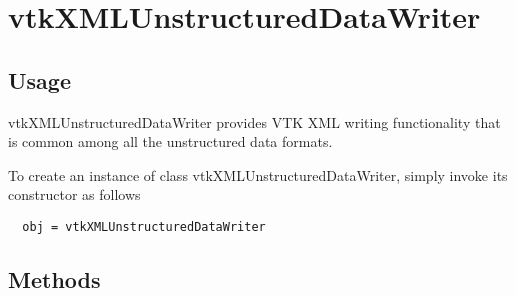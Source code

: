 \section{vtkXMLUnstructuredDataWriter}

\subsection{Usage}

 vtkXMLUnstructuredDataWriter provides VTK XML writing functionality
 that is common among all the unstructured data formats.

To create an instance of class vtkXMLUnstructuredDataWriter, simply
invoke its constructor as follows
\begin{verbatim}
  obj = vtkXMLUnstructuredDataWriter
\end{verbatim}
\subsection{Methods}

